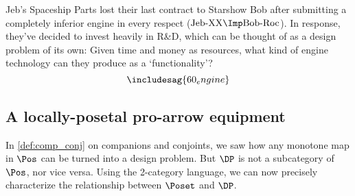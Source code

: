 \begin{example}\label{ex:r&d}
Jeb's Spaceship Parts lost their last contract to Starshow Bob after submitting a completely inferior engine in every respect ($\text{Jeb-XX} \Imp \text{Bob-Roc}$). In response, they've decided to invest heavily in R\&D, which can be thought of as a design problem of its own: Given time and money as resources, what kind of engine technology can they produce as a `functionality'?
\[
\includesag{60_engine}
\]
\end{example}
\subsection{A locally-posetal pro-arrow equipment}
 In \cref{def:comp_conj} on companions and conjoints, we saw how any monotone map in $\Pos$ can be turned into a design problem. But $\DP$ is not a subcategory of $\Pos$, nor vice versa. Using the 2-category language, we can now precisely characterize the relationship between $\Poset$ and $\DP$. %


